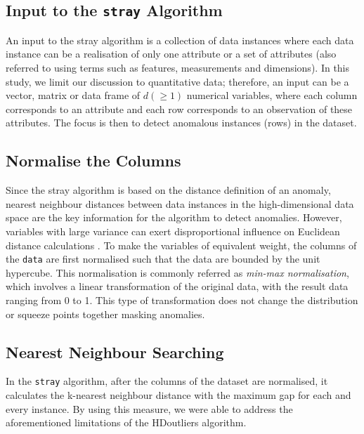\documentclass[11pt,a4paper,]{article}
\theoremstyle{definition}
\theoremstyle{definition}
\theoremstyle{definition}
\theoremstyle{remark}
\begin{document}
\hypertarget{input-to-the-stray-algorithm}{%
\subsection{\texorpdfstring{Input to the \texttt{stray} Algorithm}{Input to the stray Algorithm}}\label{input-to-the-stray-algorithm}}

An input to the stray algorithm is a collection of data instances where each data instance can be a realisation of only one attribute or a set of attributes (also referred to using terms such as features, measurements and dimensions). In this study, we limit our discussion to quantitative data; therefore, an input can be a vector, matrix or data frame of \(d (\geq1)\) numerical variables, where each column corresponds to an attribute and each row corresponds to an observation of these attributes. The focus is then to detect anomalous instances (rows) in the dataset.

\hypertarget{normalise-the-columns}{%
\subsection{Normalise the Columns}\label{normalise-the-columns}}

Since the stray algorithm is based on the distance definition of an anomaly, nearest neighbour distances between data instances in the high-dimensional data space are the key information for the algorithm to detect anomalies. However, variables with large variance can exert disproportional influence on Euclidean distance calculations \autocite{wilkinson2017visualizing}. To make the variables of equivalent weight, the columns of the \texttt{data} are first normalised such that the data are bounded by the unit hypercube. This normalisation is commonly referred as \emph{min-max normalisation}, which involves a linear transformation of the original data, with the result
data ranging from 0 to 1. This type of transformation does not change the distribution or squeeze points together masking anomalies.

\hypertarget{nearest-neighbour-searching}{%
\subsection{Nearest Neighbour Searching}\label{nearest-neighbour-searching}}

In the \texttt{stray} algorithm, after the columns of the dataset are normalised, it calculates the k-nearest neighbour distance with the maximum gap for each and every instance. By using this measure, we were able to address the aforementioned limitations of the HDoutliers algorithm.
\end{document}
